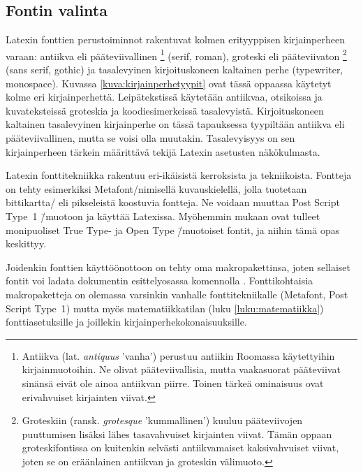 \subsection{Fontin valinta}

Latexin fonttien perus\-toiminnot rakentuvat kolmen erityyppisen
kirjainperheen varaan: antiikva eli pääteviivallinen%
\footnote{Antiikva (lat. \emph{antiquus} 'vanha') perustuu antiikin
  Roomassa käytettyihin kirjainmuotoihin. Ne olivat pääteviivallisia,
  mutta vaakasuorat pääteviivat sinänsä eivät ole ainoa antiikvan
  piirre. Toinen tärkeä ominaisuus ovat erivahvuiset kirjainten viivat.}
(\textenglish{serif, roman}), groteski eli pääteviivaton%
\footnote{Groteskiin (ransk. \emph{grotesque} 'kummallinen') kuuluu
  pääteviivojen puuttumisen lisäksi lähes tasavahvuiset kirjainten
  viivat. Tämän oppaan groteskifontissa on kuitenkin selvästi
  antiikvamaiset kaksivahvuiset viivat, joten se on eräänlainen
  antiikvan ja groteskin välimuoto.} (\textenglish{sans serif, gothic})
ja tasalevyinen kirjoituskoneen kaltainen perhe
(\textenglish{typewriter, monospace}). Kuvassa
\ref{kuva:kirjainperhetyypit} ovat tässä oppaassa käytetyt kolme eri
kirjainperhettä. Leipätekstissä käytetään antiikvaa, otsikoissa ja
kuvateksteissä groteskia ja koodi\-esi\-mer\-keis\-sä tasalevyistä.
Kirjoituskoneen kaltainen tasalevyinen kirjainperhe on tässä tapauksessa
tyypiltään antiikva eli pääteviivallinen, mutta se voisi olla muutakin.
Tasalevyisyys on sen kirjainperheen tärkein määrittävä tekijä Latexin
asetusten näkökulmasta.


Latexin fonttitekniikka rakentuu eri-ikäisistä kerroksista ja
tekniikoista. Fontteja on tehty esimerkiksi Metafont\-/nimisellä
kuvauskielellä, jolla tuotetaan bittikartta\-/{} eli pikseleistä
koostuvia fontteja. Ne voidaan muuttaa Post Script Type~1 \=/muotoon ja
käyttää Latexissa. Myöhemmin mukaan ovat tulleet monipuoliset True Type-
ja Open Type \=/muotoiset fontit, ja niihin tämä opas keskittyy.

Joidenkin fonttien käyttöön\-ottoon on tehty oma makropakettinsa, joten
sellaiset fontit voi ladata dokumentin esittelyosassa komennolla
. Fonttikohtaisia makropaketteja on olemassa
varsinkin vanhalle fonttitekniikalle (Metafont, Post Script Type~1)
mutta myös matematiikkatilan (luku \ref{luku:matematiikka})
fonttiasetuksille ja joillekin kir\-jain\-perhe\-koko\-nai\-suuk\-sille.

